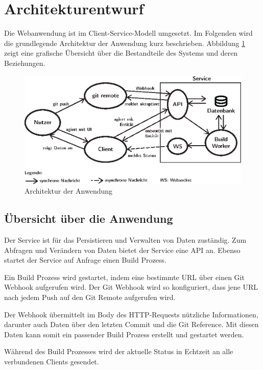 \section{Architekturentwurf}

Die Webanwendung ist im Client-Service-Modell umgesetzt. Im Folgenden wird die grundlegende Architektur der Anwendung kurz beschrieben. Abbildung \ref{fig:architektur} zeigt eine grafische Übersicht über die Bestandteile des Systems und deren Beziehungen.

\begin{figure}[h]
  \caption{Architektur der Anwendung}
  \label{fig:architektur}
  \centering
    \includegraphics[width=\textwidth]{assets/systemarchitektur}
\end{figure}

\subsection{Übersicht über die Anwendung}
\label{subsec:uebersicht-anwendung}

Der Service ist für das Persistieren und Verwalten von Daten zuständig. Zum Abfragen und Verändern von Daten bietet der Service eine \ac{API} an. Ebenso startet der Service auf Anfrage einen Build Prozess.

Ein Build Prozess wird gestartet, indem eine bestimmte URL über einen Git Webhook aufgerufen wird. Der Git Webhook wird so konfiguriert, dass jene URL nach jedem Push auf den Git Remote aufgerufen wird.

Der Webhook übermittelt im Body des HTTP-Requests nützliche Informationen, darunter auch Daten über den letzten Commit und die Git Reference. Mit diesen Daten kann somit ein passender Build Prozess erstellt und gestartet werden.

Während des Build Prozesses wird der aktuelle Status in Echtzeit an alle verbundenen Clients gesendet.

